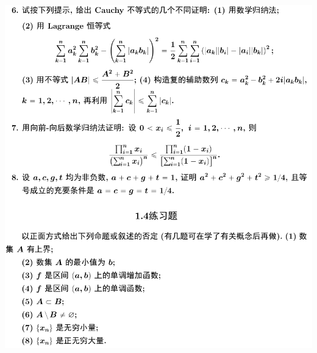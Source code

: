 \documentclass[11pt,a4paper]{ctexart}
\begin{document}
\begin{paracol}{2}
\includegraphics[width=\linewidth]{figure02.png}


\small
\switchcolumn





\end{paracol}
\end{document}
